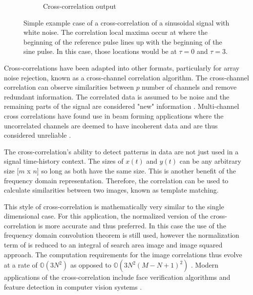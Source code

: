 \begin{figure} [h]
\begin{subfigure}[b]{0.45\textwidth}
                    \caption{Cross-correlation output}
                    \label{fig:xcorr out}
                \end{subfigure}
                \hfill
                \caption{Simple example case of a cross-correlation of a sinusoidal signal with white noise. The correlation local maxima occur at where the beginning of the reference pulse lines up with the beginning of the sine pulse. In this case, those locations would be at $\tau = 0$ and $\tau = 3$.}
                \label{fig:example 1}
            \end{figure} 

            Cross-correlations have been adapted into other formats, particularly for array noise rejection, known as a cross-channel correlation algorithm. The cross-channel correlation can observe similarities between $p$ number of channels and remove redundant information. The correlated data is assumed to be noise and the remaining parts of the signal are considered "new" information \cite{michels_multichannel_1995}. Multi-channel cross correlations have found use in beam forming applications where the uncorrelated channels are deemed to have incoherent data and are thus considered unreliable \cite{kumatani_channel_2011}.

            The cross-correlation's ability to detect patterns in data are not just used in a signal time-history context. The sizes of $x(t)$ and $y(t)$ can be any arbitrary size [$m$ x $n$] so long as both have the same size. This is another benefit of the frequency domain representation. Therefore, the correlation can be used to calculate similarities between two images, known as template matching. 
            
            This style of cross-correlation is mathematically very similar to the single dimensional case. For this application, the normalized version of the cross-correlation is more accurate and thus preferred. In this case the use of the frequency domain convolution theorem is still used, however the normalization term of is reduced to an integral of search area image and image squared approach. The computation requirements for the image correlations thus evolve at a rate of $\mathbb{O}(3N^2)$ as opposed to $\mathbb{O}(3N^2(M-N + 1)^2)$ \cite{lewis_fast_1995}. Modern applications of the cross-correlation include face verification algorithms and feature detection in computer vision systems \cite{savvides_face_nodate} \cite{kumar_correlation_2006} \cite{hsu_correlation-based_2018}. 

